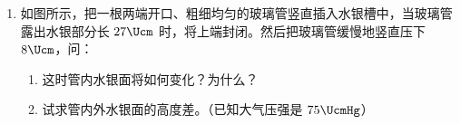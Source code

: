 \documentclass[\gkver]{gaokaozhenti}
\begin{document}
\begin{enumerate}
{$mg\sin\alpha-f=ma$　（1）（1 分）

$N-mg\cos\alpha=0$　（2）

其中 $\alpha$ 是斜面的倾角，由题中已知条件有：$\sin\alpha=\frac{h}{l}=0.60$，$\cos\alpha=0.80$。

由滑动摩擦力公式得：$f=\mu N=\mu mg\cos\alpha$　（3）（1 分）

代入得：$mg\sin\alpha-\mu mg\cos\alpha=ma$　（4）（1 分）

解得：$a=(\sin\alpha-\mu\cos\alpha)g=(0.60-0.30\times0.80)\times10\Umsq=3.6\Umsq$。（1 分）

（如直接写出（4）式也给 3 分。）

（2）解：木块沿斜面滑下时做匀加速运动，设所需时间为 $t$，由运动学公式 $s=\frac{1}{2}at^{2}$（1 分）

得 $t=\sqrt{\frac{2s}{a}}=\sqrt{\frac{2\times5.0}{3.6}}\Us$（1 分）

$=1.7\Us$（或 $\frac{5}{3}\Us$）（1 分）
}

\item
如图所示，把一根两端开口、粗细均匀的玻璃管竖直插入水银槽中，当玻璃管露出水银部分长 $27\Ucm$ 时，将上端封闭。然后把玻璃管缓慢地竖直压下 $8\Ucm$，问：
\begin{enumerate}
	\item
	这时管内水银面将如何变化？为什么？
	\item
	试求管内外水银面的高度差。（已知大气压强是 $75\UcmHg$）
\end{enumerate}
\onepicture[align=right, w=5cm]{}


\end{enumerate}
\end{document}
